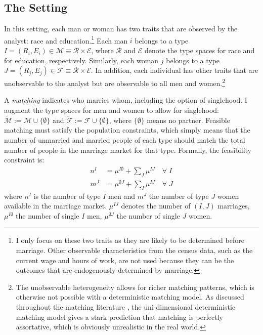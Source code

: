 
\subsection{The Setting}

In this setting, each man or woman has two traits that are observed by the analyst: race and education.\footnote{I only focus on these two traits as they are likely to be determined before marriage.  Other observable characteristics from the census data, such as the current wage and hours of work, are not used because they can be the outcomes that are endogenously determined by marriage.} Each man $i$ belongs to a type $I = (R_i, E_i) \in \mathcal{M} \equiv  \mathcal{R} \times \mathcal{E}$, where $\mathcal{R}$ and $\mathcal{E}$ denote the type spaces for race and for education, respectively. Similarly, each woman $j$ belongs to a type $J = (R_j, E_j) \in \mathcal{F} \equiv \mathcal{R} \times \mathcal{E}$. In addition, each individual has other traits that are unobservable to the analyst but are observable to all men and women.\footnote{The unobservable heterogeneity allows for richer matching patterns, which is otherwise not possible with a deterministic matching model. As discussed throughout the matching literature \citep{ChiapporiSalanie_2016_EconometricsMatching, chiappori_book_2017, GalichonSalanie_2022_CupidInvisibleHand}, the uni-dimensional deterministic matching model gives a stark prediction that matching is perfectly assortative, which is obviously unrealistic in the real world.} 
  
 A \textit{matching} indicates who marries whom, including the option of singlehood. I augment the type spaces for men and women to allow for singlehood: $\mathcal{\tilde{M}} := \mathcal{M} \cup \{ \emptyset \} $ and $\mathcal{\tilde{F}} := \mathcal{F} \cup \{ \emptyset \} $, where $\{\emptyset \}$ means no partner. Feasible matching must satisfy the population constraints, which simply means that the number of unmarried and married people of each type should match the total number of people in the marriage market for that type. Formally, the feasibility constraint is:  
 \begin{align}
 	n^I &= \mu^{I\emptyset} + \sum_J \mu^{IJ} \quad \forall \; I \label{eq:popconsI}  \\
 	m^J &= \mu^{\emptyset J} + \sum_I \mu^{IJ} \quad \forall \; J \label{eq:popconsJ} 
 \end{align}
where $n^I$ is the number of type $I$ men and $m^J$ the number of type $J$ women available in the marriage market.  $\mu^{IJ}$ denotes the number of $(I,J)$ marriages, $\mu^{I\emptyset}$ the number of single $I$ men, $\mu^{\emptyset J}$ the number of single $J$ women. 

